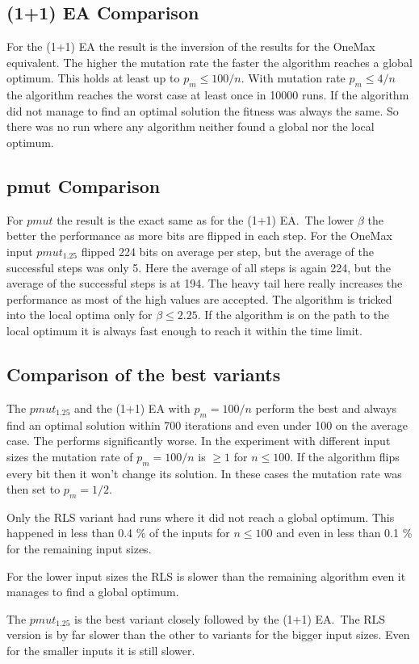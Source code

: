 \subsection{(1+1) EA Comparison}


For the (1+1) EA the result is the inversion of the results for the OneMax equivalent.
The higher the mutation rate the faster the algorithm reaches a global optimum.
This holds at least up to $p_m\le100/n$.
With mutation rate $p_m\le4/n$ the algorithm reaches the worst case at least once in 10000 runs.
If the algorithm did not manage to find an optimal solution the fitness was always the same.
So there was no run where any algorithm neither found a global nor the local optimum.
\subsection{pmut Comparison}


For $pmut$ the result is the exact same as for the (1+1) EA.\ 
The lower $\beta$ the better the performance as more bits are flipped in each step.
For the OneMax input $pmut_{1.25}$ flipped 224 bits on average per step, but the average of the successful steps was only 5.
Here the average of all steps is again 224, but the average of the successful steps is at 194.
The heavy tail here really increases the performance as most of the high values are accepted.
The algorithm is tricked into the local optima only for $\beta\le2.25$.
If the algorithm is on the path to the local optimum it is always fast enough to reach it within the time limit.
\subsection{Comparison of the best variants}
% 
% 
The $pmut_{1.25}$ and the (1+1) EA with $p_m=100/n$ perform the best and always find an optimal solution within 700 iterations and even under 100 on the average case.
The \RLSN[4] performs significantly worse.
In the experiment with different input sizes the mutation rate of $p_m=100/n$ is $\ge1$ for $n\le100$.
If the algorithm flips every bit then it won't change its solution.
In these cases the mutation rate was then set to $p_m=1/2$.



Only the RLS variant had runs where it did not reach a global optimum.
This happened in less than 0.4 \% of the inputs for $n\le100$ and even in less than 0.1 \% for the remaining input sizes.



For the lower input sizes the RLS is slower than the remaining algorithm even it manages to find a global optimum.



The $pmut_{1.25}$ is the best variant closely followed by the (1+1) EA.\
The RLS version is by far slower than the other to variants for the bigger input sizes.
Even for the smaller inputs it is still slower.
